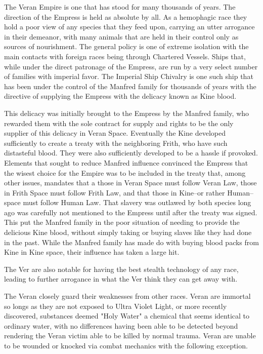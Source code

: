\documentclass[blue]{guildcamp4}
\begin{document}
\name{\bVer{}}

The Veran Empire is one that has stood for many thousands of years. The direction of the Empress is held as absolute by all. As a hemophagic race they hold a poor view of any species that they feed upon, carrying an utter arrogance in their demeanor, with many animals that are held in their control only as sources of nourishment. The general policy is one of extreme isolation with the main contacts with foreign races being through Chartered Vessels. Ships that, while under the direct patronage of the Empress, are run by a very select number of families with imperial favor. The Imperial Ship Chivalry is one such ship that has been under the control of the Manfred family for thousands of years with the directive of supplying the Empress with the delicacy known as Kine blood. 

This delicacy was initially brought to the Empress by the Manfred family, who rewarded them with the sole contract for supply and rights to be the only supplier of this delicacy in Veran Space. Eventually the Kine developed sufficiently to create a treaty with the neighboring Frith, who have such distasteful blood. They were also sufficiently developed to be a hassle if provoked. Elements that sought to reduce Manfred influence convinced the Empress that the wisest choice for the Empire was to be included in the treaty that, among other issues, mandates that a those in Veran Space must follow Veran Law, those in Frith Space must follow Frith Law, and that those in Kine--or rather Human--space must follow Human Law. That slavery was outlawed by both species long ago was carefully not mentioned to the Empress until after the treaty was signed. This put the Manfred family in the poor situation of needing to provide the delicious Kine blood, without simply taking or buying slaves like they had done in the past. While the Manfred family has made do with buying blood packs from Kine in Kine space, their influence has taken a large hit.

The Ver are also notable for having the best stealth technology of any race, leading to further arrogance in what the Ver think they can get away with.

The Veran closely guard their weaknesses from other races. Veran are immortal so longs as they are not exposed to Ultra Violet Light, or more recently discovered, substances deemed "Holy Water" a chemical that seems identical to ordinary water, with no differences having been able to be detected beyond rendering the Veran victim able to be killed by normal trauma. 
Veran are unable to be wounded or knocked via combat mechanics with the following exception.
\end{document}
